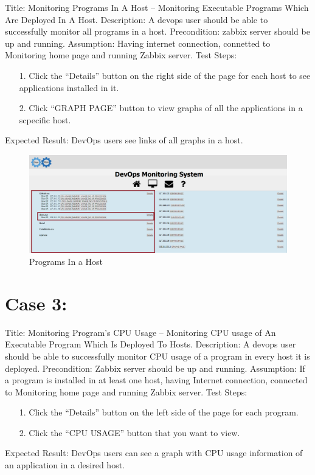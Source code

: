 \documentclass{article}
\begin{document}
		Title: Monitoring Programs In A Host  – Monitoring Executable Programs Which Are  Deployed  In A Host.
	\newline
	Description: A devops user should be able to successfully monitor all programs in a host.
	\newline
	Precondition: zabbix server should be up and running.
	\newline
	Assumption: Having internet connection, connetted to Monitoring home page and running Zabbix server.
	\newline
	\newline
	Test Steps:
	\begin{itemize}
		\item[1.] 	Click the “Details” button on the right side of the page for each host to see applications installed in it.
		\item[2.]	Click “GRAPH PAGE” button to view graphs of all the applications in a scpecific host.
		
	\end{itemize}
	Expected Result: DevOps users see links of all graphs in a host.
	
	\begin{figure}[H]
		\centering
		\includegraphics[scale=0.3,width=\linewidth]{2}
		\caption{Programs In a Host}
	\end{figure}
	
\section*{Case 3:}
	Title: Monitoring Program’s CPU Usage  – Monitoring CPU usage of An Executable Program Which Is Deployed To Hosts.
		\newline
	Description: A devops user should be able to successfully monitor CPU usage of a program in every host it is deployed.
	\newline
	Precondition: Zabbix server should be up and running.
	\newline
	Assumption:  If a program is installed in at least one host, having Internet connection, connected to Monitoring home page and running Zabbix server.
	\newline
	\newline
	Test Steps:
	\begin{itemize}
	\item[1.]	Click the “Details” button on the left side of the page for each program.
	\item [2.]	Click the “CPU USAGE” button that you want to view.
	\end{itemize}
	Expected Result: DevOps users can see a graph with CPU usage information of an application in a desired host.
	
\end{document}

